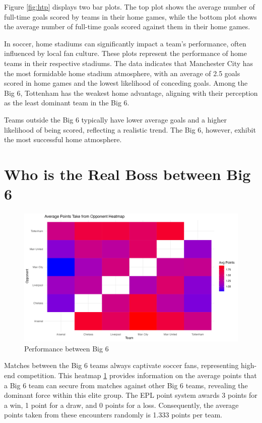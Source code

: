 \documentclass{article}
\begin{document}
Figure \ref{fig:htp} displays two bar plots. The top plot shows the average number of full-time goals scored by teams in their home games, while the bottom plot shows the average number of full-time goals scored against them in their home games.

In soccer, home stadiums can significantly impact a team's performance, often influenced by local fan culture. These plots represent the performance of home teams in their respective stadiums. The data indicates that Manchester City has the most formidable home stadium atmosphere, with an average of 2.5 goals scored in home games and the lowest likelihood of conceding goals. Among the Big 6, Tottenham has the weakest home advantage, aligning with their perception as the least dominant team in the Big 6.

Teams outside the Big 6 typically have lower average goals and a higher likelihood of being scored, reflecting a realistic trend. The Big 6, however, exhibit the most successful home atmosphere.

\section{Who is the Real Boss between Big 6}

\begin{figure}[h!]
\centering
\includegraphics[width=\textwidth]{avg_points_heatmap_big6.png}
\caption{\label{fig:heatmap}Performance between Big 6}
\end{figure}

Matches between the Big 6 teams always captivate soccer fans, representing high-end competition. This heatmap \ref{fig:heatmap} provides information on the average points that a Big 6 team can secure from matches against other Big 6 teams, revealing the dominant force within this elite group. The EPL point system awards 3 points for a win, 1 point for a draw, and 0 points for a loss. Consequently, the average points taken from these encounters randomly is 1.333 points per team.
\end{document}
